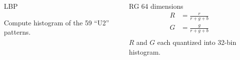 \documentclass{beamer}
\begin{document}
\begin{frame}
\begin{columns}
\begin{column}{.3\textwidth}
\begin{block}{LBP}
\begin{figure}
\end{figure}
Compute histogram of the 59 ``U2'' patterns.
\end{block}
\end{column}
\pause
\begin{column}{.3\textwidth}
\begin{block}{RG}
64 dimensions
\begin{equation}
\begin{split}
R &= \frac{r}{r+g+b} \\
G &= \frac{g}{r+g+b} \\
\end{split}
\end{equation}
$R$ and $G$ each quantized into 32-bin histogram.
\end{block}
\end{column}
\end{columns}
\end{frame}
\end{document}
